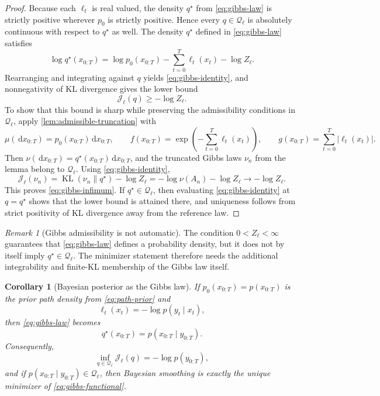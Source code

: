 \documentclass[11pt]{article}
\newcommand{\KL}{\operatorname{KL}}
\newcommand{\dd}{\,\mathrm d}
\newcommand{\xtraj}{x_{0:T}}
\newcommand{\ytraj}{y_{0:T}}
\newcommand{\abs}[1]{\left\lvert #1 \right\rvert}
\newcommand{\mc}{\mathcal}
\numberwithin{equation}{section}
\theoremstyle{plain}
\newtheorem{corollary}[theorem]{Corollary}
\theoremstyle{definition}
\theoremstyle{remark}
\newtheorem{remark}[theorem]{Remark}
\begin{document}
\begin{proof}
Because each $\ell_t$ is real valued, the density $q^\star$ from \cref{eq:gibbs-law} is strictly positive wherever $p_0$ is strictly positive. Hence every $q\in\mc Q_\ell$ is absolutely continuous with respect to $q^\star$ as well.
The density $q^\star$ defined in \cref{eq:gibbs-law} satisfies
\[
\log q^\star(\xtraj)
=
\log p_0(\xtraj) - \sum_{t=0}^{T}\ell_t(x_t)-\log Z_\ell.
\]
Rearranging and integrating against $q$ yields \cref{eq:gibbs-identity}, and nonnegativity of KL divergence gives the lower bound
\[
\mc J_\ell(q)\ge -\log Z_\ell.
\]
To show that this bound is sharp while preserving the admissibility conditions in $\mc Q_\ell$, apply \cref{lem:admissible-truncation} with
\[
\mu(\dd \xtraj)=p_0(\xtraj)\dd \xtraj,
\qquad
f(\xtraj)=\exp\!\left(-\sum_{t=0}^{T}\ell_t(x_t)\right),
\qquad
g(\xtraj)=\sum_{t=0}^{T}\abs{\ell_t(x_t)}.
\]
Then $\nu(\dd \xtraj)=q^\star(\xtraj)\dd \xtraj$, and the truncated Gibbs laws $\nu_n$ from the lemma belong to $\mc Q_\ell$. Using \cref{eq:gibbs-identity},
\[
\mc J_\ell(\nu_n)
=
\KL(\nu_n\|q^\star)-\log Z_\ell
=
-\log \nu(A_n)-\log Z_\ell\to -\log Z_\ell.
\]
This proves \cref{eq:gibbs-infimum}. If $q^\star\in\mc Q_\ell$, then evaluating \cref{eq:gibbs-identity} at $q=q^\star$ shows that the lower bound is attained there, and uniqueness follows from strict positivity of KL divergence away from the reference law.
\end{proof}

\begin{remark}[Gibbs admissibility is not automatic]
\label{rem:gibbs-admissibility}
The condition $0<Z_\ell<\infty$ guarantees that \cref{eq:gibbs-law} defines a probability density, but it does not by itself imply $q^\star\in\mc Q_\ell$. The minimizer statement therefore needs the additional integrability and finite-KL membership of the Gibbs law itself.
\end{remark}

\begin{corollary}[Bayesian posterior as the Gibbs law]
\label{cor:posterior-gibbs}
If $p_0(\xtraj)=p(\xtraj)$ is the prior path density from \cref{eq:path-prior} and
\begin{equation}
\ell_t(x_t) = -\log p(y_t\mid x_t),
\end{equation}
then \cref{eq:gibbs-law} becomes
\begin{equation}
q^\star(\xtraj) = p(\xtraj\mid \ytraj).
\end{equation}
Consequently,
\[
\inf_{q\in\mc Q_\ell}\mc J_\ell(q) = -\log p(\ytraj),
\]
and if $p(\xtraj\mid \ytraj)\in\mc Q_\ell$, then Bayesian smoothing is exactly the unique minimizer of \cref{eq:gibbs-functional}.
\end{corollary}
\end{document}
